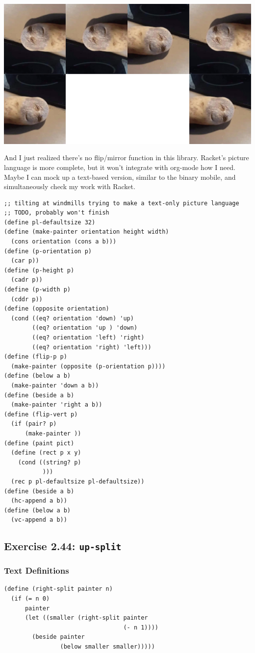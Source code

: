\documentclass[final,fleqn,titlepage,twoside]{article}
\begin{document}
\begin{center}
\includegraphics[width=.9\linewidth]{2/pict/Rotato.png}
\end{center}

And I just realized there's no flip/mirror function in this library. Racket's
picture language is more complete, but it won't integrate with org-mode how I
need. Maybe I can mock up a text-based version, similar to the binary mobile,
and simultaneously check my work with Racket.

\begin{verbatim}
;; tilting at windmills trying to make a text-only picture language
;; TODO, probably won't finish
(define pl-defaultsize 32)
(define (make-painter orientation height width)
  (cons orientation (cons a b)))
(define (p-orientation p)
  (car p))
(define (p-height p)
  (cadr p))
(define (p-width p)
  (cddr p))
(define (opposite orientation)
  (cond ((eq? orientation 'down) 'up)
        ((eq? orientation 'up ) 'down)
        ((eq? orientation 'left) 'right)
        ((eq? orientation 'right) 'left)))
(define (flip-p p)
  (make-painter (opposite (p-orientation p))))
(define (below a b)
  (make-painter 'down a b))
(define (beside a b)
  (make-painter 'right a b))
(define (flip-vert p)
  (if (pair? p)
      (make-painter ))
(define (paint pict)
  (define (rect p x y)
    (cond ((string? p)
           )))
  (rec p pl-defaultsize pl-defaultsize))
(define (beside a b)
  (hc-append a b))
(define (below a b)
  (vc-append a b))
\end{verbatim}


\subsection{Exercise 2.44: \texttt{up-split}}
\label{sec:orgcb65651}
\subsubsection{Text Definitions}
\label{sec:orgdc463f7}
\begin{verbatim}
(define (right-split painter n)
  (if (= n 0)
      painter
      (let ((smaller (right-split painter 
                                  (- n 1))))
        (beside painter 
                (below smaller smaller)))))
\end{verbatim}
\end{document}
